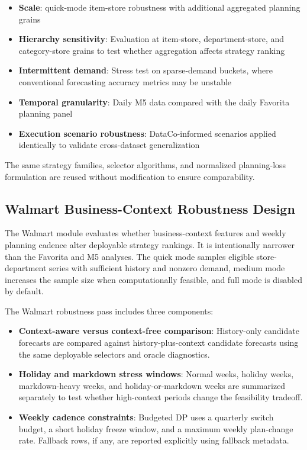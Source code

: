 \begin{itemize}
    \item \textbf{Scale}: quick-mode item-store robustness with additional aggregated planning grains
    \item \textbf{Hierarchy sensitivity}: Evaluation at item-store, department-store, and category-store grains to test whether aggregation affects strategy ranking
    \item \textbf{Intermittent demand}: Stress test on sparse-demand buckets, where conventional forecasting accuracy metrics may be unstable
    \item \textbf{Temporal granularity}: Daily M5 data compared with the daily Favorita planning panel
    \item \textbf{Execution scenario robustness}: DataCo-informed scenarios applied identically to validate cross-dataset generalization
\end{itemize}

The same strategy families, selector algorithms, and normalized planning-loss formulation are reused without modification to ensure comparability.

\subsection{Walmart Business-Context Robustness Design}

The Walmart module evaluates whether business-context features and weekly planning cadence alter deployable strategy rankings. It is intentionally narrower than the Favorita and M5 analyses. The quick mode samples eligible store-department series with sufficient history and nonzero demand, medium mode increases the sample size when computationally feasible, and full mode is disabled by default.

The Walmart robustness pass includes three components:
\begin{itemize}
    \item \textbf{Context-aware versus context-free comparison}: History-only candidate forecasts are compared against history-plus-context candidate forecasts using the same deployable selectors and oracle diagnostics.
    \item \textbf{Holiday and markdown stress windows}: Normal weeks, holiday weeks, markdown-heavy weeks, and holiday-or-markdown weeks are summarized separately to test whether high-context periods change the feasibility tradeoff.
    \item \textbf{Weekly cadence constraints}: Budgeted DP uses a quarterly switch budget, a short holiday freeze window, and a maximum weekly plan-change rate. Fallback rows, if any, are reported explicitly using fallback metadata.
\end{itemize}

